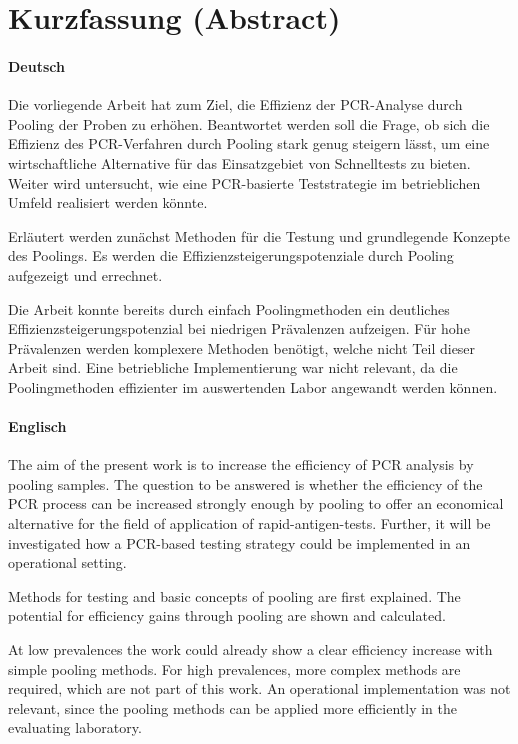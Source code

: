 \chapter*{Kurzfassung (Abstract)}

\subsubsection{Deutsch}
Die vorliegende Arbeit hat zum Ziel, die Effizienz der PCR-Analyse durch Pooling der Proben zu erhöhen.
Beantwortet werden soll die Frage, ob sich die Effizienz des PCR-Verfahren durch Pooling stark genug steigern lässt, um eine wirtschaftliche Alternative für das Einsatzgebiet von Schnelltests zu bieten.
Weiter wird untersucht, wie eine PCR-basierte Teststrategie im betrieblichen Umfeld realisiert werden könnte.

Erläutert werden zunächst Methoden für die Testung und grundlegende Konzepte des Poolings.
Es werden die Effizienzsteigerungspotenziale durch Pooling aufgezeigt und errechnet.

Die Arbeit konnte bereits durch einfach Poolingmethoden ein deutliches Effizienzsteigerungspotenzial bei niedrigen Prävalenzen aufzeigen.
Für hohe Prävalenzen werden komplexere Methoden benötigt, welche nicht Teil dieser Arbeit sind. 
Eine betriebliche Implementierung war nicht relevant, da die Poolingmethoden effizienter im auswertenden Labor angewandt werden können.

\subsubsection{Englisch} %
The aim of the present work is to increase the efficiency of PCR analysis by pooling samples.
The question to be answered is whether the efficiency of the PCR process can be increased strongly enough by pooling to offer an economical alternative for the field of application of rapid-antigen-tests.
Further, it will be investigated how a PCR-based testing strategy could be implemented in an operational setting.

Methods for testing and basic concepts of pooling are first explained.
The potential for efficiency gains through pooling are shown and calculated.

At low prevalences the work could already show a clear efficiency increase with simple pooling methods.
For high prevalences, more complex methods are required, which are not part of this work. 
An operational implementation was not relevant, since the pooling methods can be applied more efficiently in the evaluating laboratory.